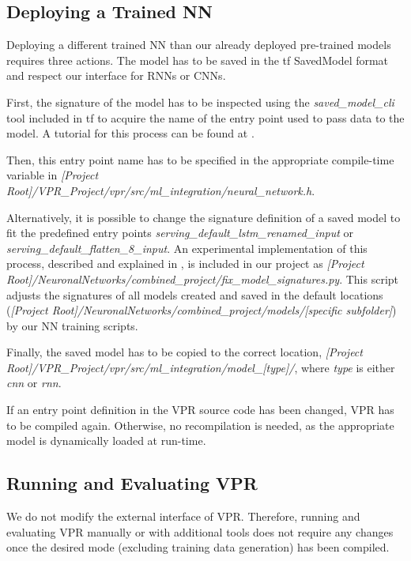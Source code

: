 \subsection{Deploying a Trained \gls{NN}}

Deploying a different trained \gls{NN} than our already deployed pre-trained models requires three actions. The model has to be saved in the \gls{tf} SavedModel format and respect our interface for \glspl{RNN} or \glspl{CNN}.

First, the signature of the model has to be inspected using the \textit{saved\_model\_cli} tool included in \gls{tf} to acquire the name of the entry point used to pass data to the model. A tutorial for this process can be found at \cite{tf-inspect-savedmodel}.

Then, this entry point name has to be specified in the appropriate compile-time variable in \textit{[Project Root]/VPR\_Project/vpr/src/ml\_integration/neural\_network.h}.

Alternatively, it is possible to change the signature definition of a saved model to fit the predefined entry points \textit{serving\_default\_lstm\_renamed\_input} or \textit{serving\_default\_flatten\_8\_input}. An experimental implementation of this process, described and explained in \cite{rename-savedmodel}, is included in our project as \textit{[Project Root]/NeuronalNetworks/combined\_project/fix\_model\_signatures.py}. This script adjusts the signatures of all models created and saved in the default locations (\textit{[Project Root]/NeuronalNetworks/combined\_project/models/[specific subfolder]}) by our \gls{NN} training scripts.

Finally, the saved model has to be copied to the correct location, \textit{[Project Root]/VPR\_Project/vpr/src/ml\_integration/model\_[type]/}, where \textit{type} is either \textit{cnn} or \textit{rnn}.

If an entry point definition in the \gls{VPR} source code has been changed, \gls{VPR} has to be compiled again. Otherwise, no recompilation is needed, as the appropriate model is dynamically loaded at run-time.

\subsection{Running and Evaluating \gls{VPR}}

We do not modify the external interface of \gls{VPR}. Therefore, running and evaluating \gls{VPR} manually or with additional tools does not require any changes once the desired mode (excluding training data generation) has been compiled.

